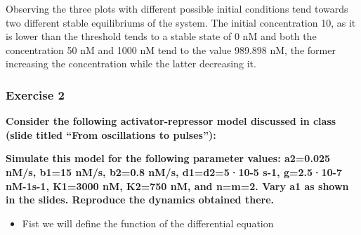 \documentclass[11pt]{article}
\providecommand{\tightlist}{%
      \setlength{\itemsep}{0pt}\setlength{\parskip}{0pt}}
\begin{document}
    Observing the three plots with different possible initial conditions
tend towards two different stable equilibriums of the system. The
initial concentration 10, as it is lower than the threshold tends to a
stable state of 0 nM and both the concentration 50 nM and 1000 nM tend
to the value 989.898 nM, the former increasing the concentration while
the latter decreasing it.

    \subsubsection{Exercise 2 }\label{exercise-2}

\textbf{Consider the following activator-repressor model discussed in
class (slide titled ``From oscillations to pulses''):}

\textbf{Simulate this model for the following parameter values: a2=0.025
nM/s, b1=15 nM/s, b2=0.8 nM/s, d1=d2=5·10-5 s-1, g=2.5·10-7 nM-1s-1,
K1=3000 nM, K2=750 nM, and n=m=2. Vary a1 as shown in the slides.
Reproduce the dynamics obtained there.}

    \begin{itemize}
\tightlist
\item
  Fist we will define the function of the differential equation
\end{itemize}
\end{document}
